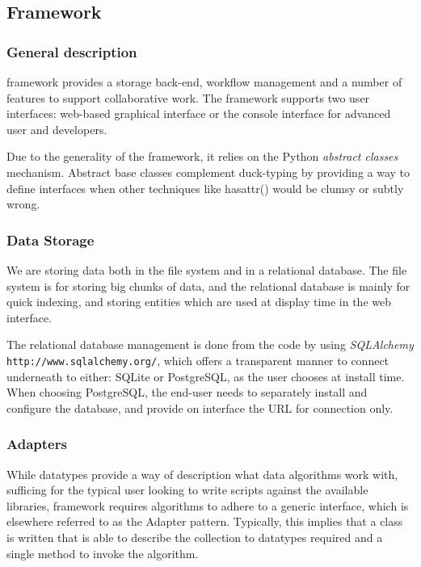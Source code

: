 
	\subsection{\TVB Framework}

	\subsubsection{General description}

\TVB framework provides a storage back-end, workflow management and a number of features to
support collaborative work. The framework supports two user interfaces: web-based graphical interface or the
console interface for advanced user and developers.

Due to the generality of the framework, it relies on the Python \emph{abstract classes} mechanism.
Abstract base classes complement duck-typing by providing a way to define
interfaces when other techniques like hasattr() would be clumsy or subtly wrong.

\subsubsection{Data Storage}

We are storing data both in the file system and in a relational database.
The file system is for storing big chunks of data, and the relational database is mainly for quick indexing, 
and storing entities which are used at display time in the web interface.

The relational database management is done from the code by using \emph{SQLAlchemy} \texttt{http://www.sqlalchemy.org/}, 
which offers a transparent manner to connect underneath to either: SQLite or PostgreSQL, as the user chooses at install time.
When choosing PostgreSQL, the end-user needs to separately install and configure the database, and provide on \TVB
interface the URL for connection only.


\subsubsection{Adapters}

While datatypes provide a way of description what data algorithms work with, 
sufficing for the typical user looking to write scripts against the
available libraries, \TVB framework requires algorithms to adhere to 
a generic interface, which is elsewhere referred to as the Adapter pattern.
Typically, this implies that a class is written that is able to describe
the collection to datatypes required and a single method to invoke the
algorithm.


